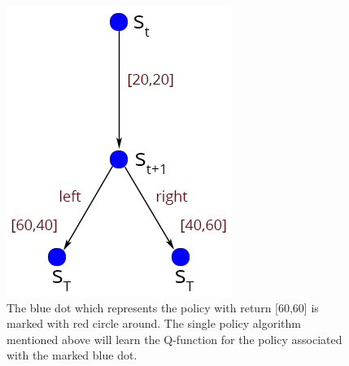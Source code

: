 \begin{figure}[ht]
\centering
\includegraphics[scale=0.6]{reasonForMPLearning.png}
\caption{The blue dot which represents the policy with return [60,60] is marked with red circle around. The single policy algorithm mentioned above will learn the Q-function for the policy associated with the marked blue dot.}
\label{fig:exampleMDPOneMarkedPolicy}
\end{figure}

